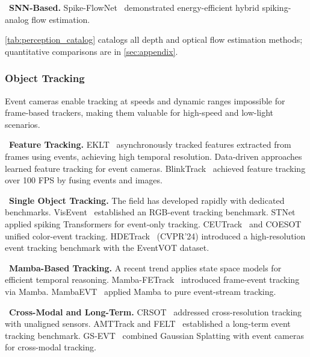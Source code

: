 \noindent{}~\textbf{SNN-Based.} Spike-FlowNet~\cite{lee2020spikeflownet} demonstrated energy-efficient hybrid spiking-analog flow estimation.

\cref{tab:perception_catalog} catalogs all depth and optical flow estimation methods; quantitative comparisons are in \cref{sec:appendix}.


\subsubsection{Object Tracking}
\label{sec:perception_track}

Event cameras enable tracking at speeds and dynamic ranges impossible for frame-based trackers, making them valuable for high-speed and low-light scenarios.

\noindent{}~\textbf{Feature Tracking.} EKLT~\cite{gehrig2019eklt} asynchronously tracked features extracted from frames using events, achieving high temporal resolution. Data-driven approaches~\cite{messikommer2023etracker} learned feature tracking for event cameras. BlinkTrack~\cite{wang2024blinktrack} achieved feature tracking over 100 FPS by fusing events and images.

\noindent{}~\textbf{Single Object Tracking.} The field has developed rapidly with dedicated benchmarks. VisEvent~\cite{wang2023visevent} established an RGB-event tracking benchmark. STNet~\cite{zhang2022stnet} applied spiking Transformers for event-only tracking. CEUTrack~\cite{tang2022ceutrack} and COESOT unified color-event tracking. HDETrack~\cite{wang2024hdetrack} (CVPR'24) introduced a high-resolution event tracking benchmark with the EventVOT dataset.

\noindent{}~\textbf{Mamba-Based Tracking.} A recent trend applies state space models for efficient temporal reasoning. Mamba-FETrack~\cite{wang2024mambafe} introduced frame-event tracking via Mamba. MambaEVT~\cite{wang2024mambaevt} applied Mamba to pure event-stream tracking.

\noindent{}~\textbf{Cross-Modal and Long-Term.} CRSOT~\cite{tang2024crsot} addressed cross-resolution tracking with unaligned sensors. AMTTrack and FELT~\cite{wang2024felt} established a long-term event tracking benchmark. GS-EVT~\cite{wang2024gsevt} combined Gaussian Splatting with event cameras for cross-modal tracking.

